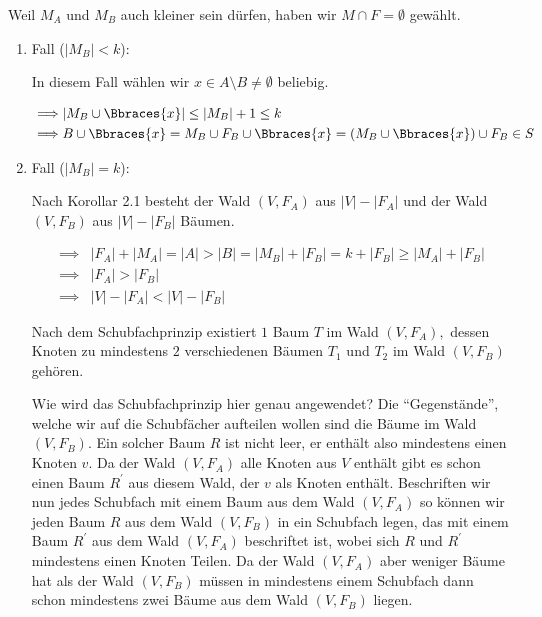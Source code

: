 \begin{solution}
\begin{enumerate}[label = \arabic*.]
    Weil $M_A$ und $M_B$ auch kleiner sein dürfen, haben wir $M \cap F = \emptyset$ gewählt.

    \begin{enumerate}[label = \arabic*.]
        
        \item Fall ($|M_B| < k$):
        
        In diesem Fall wählen wir $x \in A \setminus B \neq \emptyset$ beliebig.

        \begin{align*}
            \implies &
            |M_B \cup \Bbraces{x}| \leq |M_B| + 1 \leq k \\
            \implies &
            B \cup \Bbraces{x}
            =
            M_B \cup F_B \cup \Bbraces{x}
            =
            (M_B \cup \Bbraces{x}) \cup F_B
            \in
            S
        \end{align*}
        
        \item Fall ($|M_B| = k$):
        
        Nach Korollar 2.1 besteht der Wald $(V, F_A)$ aus $|V| - |F_A|$ und der Wald $(V, F_B)$ aus $|V| - |F_B|$ Bäumen.

        \begin{align*}
            \implies &
            |F_A| + |M_A|  = |A| > |B| = |M_B| + |F_B| = k + |F_B| \geq |M_A| + |F_B| \\
            \implies &
            |F_A| > |F_B| \\
            \implies &
            |V| - |F_A| < |V| - |F_B|
        \end{align*}

        Nach dem Schubfachprinzip existiert $1$ Baum $T$ im Wald $(V, F_A),$ dessen Knoten zu mindestens $2$ verschiedenen Bäumen $T_1$ und $T_2$ im Wald $(V, F_B)$ gehören.

        Wie wird das Schubfachprinzip hier genau angewendet?
        Die \enquote{Gegenstände}, welche wir auf die Schubfächer aufteilen wollen sind die Bäume im Wald $(V, F_B)$.
        Ein solcher Baum $R$ ist nicht leer, er enthält also mindestens einen Knoten $v$.
        Da der Wald $(V, F_A)$ alle Knoten aus $V$ enthält gibt es schon einen Baum $R^\prime$ aus diesem Wald, der $v$ als Knoten enthält.
        Beschriften wir nun jedes Schubfach mit einem Baum aus dem Wald $(V, F_A)$ so können wir jeden Baum $R$ aus dem Wald $(V, F_B)$ in ein Schubfach legen, das mit einem Baum $R^\prime$ aus dem Wald $(V, F_A)$ beschriftet ist, wobei sich $R$ und $R^\prime$ mindestens einen Knoten Teilen.
        Da der Wald $(V, F_A)$ aber weniger Bäume hat als der Wald $(V, F_B)$ müssen in mindestens einem Schubfach dann schon mindestens zwei Bäume aus dem Wald $(V, F_B)$ liegen.


\end{enumerate}
\end{enumerate}
\end{solution}
